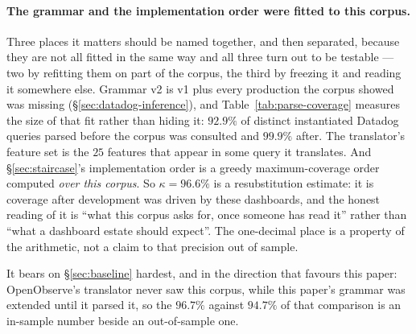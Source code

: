 \paragraph{The grammar and the implementation order were fitted to this corpus.}
Three places it matters should be named together, and then separated, because they are
not all fitted in the same way and all three turn out to be testable --- two by refitting
them on part of the corpus, the third by freezing it and reading it somewhere else.
Grammar v2 is v1 plus every production the corpus showed was missing
(\S\ref{sec:datadog-inference}), and Table~\ref{tab:parse-coverage} measures the size of
that fit rather than hiding it: $92.9\%$ of distinct instantiated Datadog queries parsed
before the corpus was consulted and $99.9\%$ after. The translator's feature set is the
$25$ features that appear in some query it translates. And \S\ref{sec:staircase}'s
implementation order is a greedy maximum-coverage order computed \emph{over this
corpus}. So $\kappa=96.6\%$ is a resubstitution estimate: it is coverage after
development was driven by these dashboards, and the honest reading of it is ``what this
corpus asks for, once someone has read it'' rather than ``what a dashboard estate should
expect''. The one-decimal place is a property of the arithmetic, not a claim to that
precision out of sample.

It bears on \S\ref{sec:baseline} hardest, and in the direction that favours this paper:
OpenObserve's translator never saw this corpus, while this paper's grammar was extended
until it parsed it, so the $96.7\%$ against $94.7\%$ of that comparison is an in-sample
number beside an out-of-sample one.

